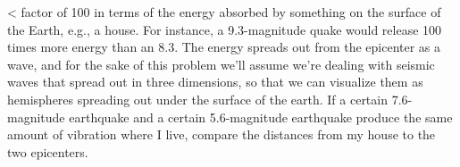 <%
factor of 100 in terms of the energy absorbed by something
on the surface of the Earth, e.g., a house. For instance, a
9.3-magnitude quake would release 100 times more energy than
an 8.3. The energy spreads out from the epicenter as a wave,
and for the sake of this problem we'll assume we're dealing
with seismic waves that spread out in three dimensions, so
that we can visualize them as hemispheres spreading out
under the surface of the earth. If a certain 7.6-magnitude
earthquake and a certain 5.6-magnitude earthquake produce
the same amount of vibration where I live, compare the
distances from my house to the two epicenters.
